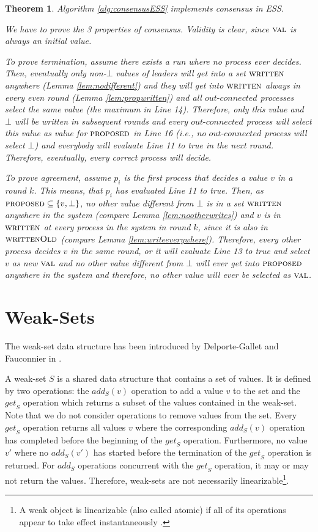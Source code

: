 \documentclass[conference, compsoc]{IEEEtran}
\newtheorem{theorem}{Theorem}
\def\val{\textsc{val}}
\def\proposed{\textsc{proposed}}
\def\written{\textsc{written}}
\def\wlr{\textsc{writtenOld}}
\def\out{\textit{out-connected}}
\def\get{\textit{get}}
\def\add{\textit{add}}
\begin{document}
\begin{theorem}
Algorithm \ref{alg:consensusESS} implements consensus in ESS.
\begin{IEEEproof} 
 We have to prove the 3 properties of consensus. Validity is clear, since $\val$ is always an initial value.
 
 To prove termination, assume there exists a run where no process ever decides. Then, eventually only non-$\bot$ values of leaders will get into a set $\written$ anywhere (Lemma \ref{lem:nodifferent}) and they will get into $\written$ always in every even round (Lemma \ref{lem:propwritten}) and all $\out$ processes select the same value (the maximum in Line 14). Therefore, only this value and $\bot$ will be written in subsequent rounds and every $\out$ process will select this value as value for $\proposed$ in Line 16 (i.e., no $\out$ process will select $\bot$) and everybody will evaluate Line 11 to true in the next round. Therefore, eventually, every correct process will decide.    
 
 To prove agreement, assume $p_i$ is the first process that decides a value $v$ in a round $k$. This means, that $p_i$ has evaluated Line 11 to true. Then, as $\proposed \subseteq \{v, \bot\}$, no other value different from $\bot$ is in a set $\written$ anywhere in the system (compare Lemma \ref{lem:nootherwrites}) and $v$ is in $\written$ at every process in the system in round $k$, since it is also in $\wlr$ (compare Lemma \ref{lem:writeeverywhere}). Therefore, every other process decides $v$ in the same round, or it will evaluate Line 13 to true and select $v$ as new $\val$ and no other value different from $\bot$ will ever get into $\proposed$ anywhere in the system and therefore, no other value will ever be selected as $\val$.

\end{IEEEproof}
\end{theorem}


\section{Weak-Sets}

The weak-set data structure has been introduced by Delporte-Gallet and Fauconnier in \cite{DF}.

A weak-set $S$ is a shared data structure that contains a set of values. It is defined by two operations: the $\add_S(v)$ operation to add a value $v$ to the set and the $\get_S$ operation which returns a subset of the values contained in the weak-set. Note that we do not consider operations to remove values from the set. Every $\get_S$ operation returns all values $v$ where the corresponding $\add_S(v)$ operation has completed before the beginning of the $\get_S$ operation. Furthermore, no value $v'$ where no $\add_S(v')$ has started before the termination of the $\get_S$ operation is returned. For $\add_S$ operations concurrent with the $\get_S$ operation, it may or may not return the values. Therefore, weak-sets are not necessarily linearizable\footnote{A weak object is linearizable (also called atomic) if all of its operations appear to take effect instantaneously \cite{67423}.}.  
\end{document}
